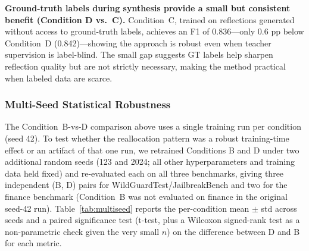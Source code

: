 \documentclass[superintelligence,article,accept,moreauthors]{Definitions/mdpi}
\begin{document}
\textbf{Ground-truth labels during synthesis provide a small but consistent benefit (Condition D vs.\ C).}
Condition~C, trained on reflections generated without access to ground-truth labels, achieves an F1 of 0.836---only 0.6 pp below Condition~D (0.842)---showing the approach is robust even when teacher supervision is label-blind. The small gap suggests GT labels help sharpen reflection quality but are not strictly necessary, making the method practical when labeled data are scarce.

\subsubsection{Multi-Seed Statistical Robustness}
\label{sec:multiseed}

The Condition~B-vs-D comparison above uses a single training run per condition (seed 42). To test whether the reallocation pattern was a robust training-time effect or an artifact of that one run, we retrained Conditions B and D under two additional random seeds (123 and 2024; all other hyperparameters and training data held fixed) and re-evaluated each on all three benchmarks, giving three independent (B, D) pairs for WildGuardTest/JailbreakBench and two for the finance benchmark (Condition~B was not evaluated on finance in the original seed-42 run). Table~\ref{tab:multiseed} reports the per-condition mean $\pm$ std across seeds and a paired significance test (t-test, plus a Wilcoxon signed-rank test as a non-parametric check given the very small $n$) on the difference between D and B for each metric.

\end{document}
